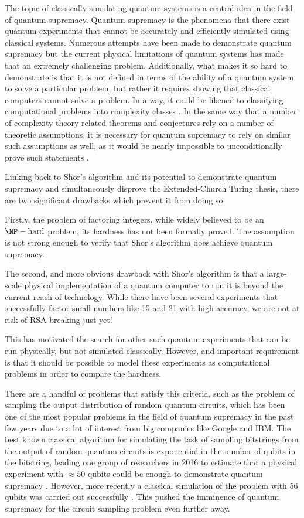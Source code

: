 \documentclass[ %
                    author={Manan Vaswani},
                supervisor={Dr. Raphael Clifford},
                    degree={MEng},
                     title={A multi-core CPU implementation \n of the classical Boson Sampling algorithm},
                  subtitle={},
                      type={},
                      year={2019} ]{dissertation}
\begin{document}
The topic of classically simulating quantum systems is a central idea in the field of quantum supremacy. Quantum supremacy is the phenomena that there exist quantum experiments that cannot be accurately and efficiently simulated using classical systems. Numerous attempts have been made to demonstrate quantum supremacy but the current physical limitations of quantum systems has made that an extremely challenging problem. Additionally, what makes it so hard to demonstrate is that it is not defined in terms of the ability of a quantum system to solve a particular problem, but rather it requires showing that classical computers cannot solve a problem. In a way, it could be likened to classifying computational problems into complexity classes \cite{papadimitriou2003}. In the same way that a number of complexity theory related theorems and conjectures rely on a number of theoretic assumptions, it is necessary for quantum supremacy to rely on similar such assumptions as well, as it would be nearly impossible to unconditionally prove such statements \cite{harrow2017}.

Linking back to Shor's algorithm and its potential to demonstrate quantum supremacy and simultaneously disprove the Extended-Church Turing thesis, there are two significant drawbacks which prevent it from doing so. 

Firstly, the problem of factoring integers, while widely believed to be an $\NP-\text{hard}$ problem, its hardness has not been formally proved. The assumption is not strong enough to verify that Shor's algorithm does achieve quantum supremacy.

The second, and more obvious drawback with Shor's algorithm is that a large-scale physical implementation of a quantum computer to run it is beyond the current reach of technology. While there have been several experiments that successfully factor small numbers like 15 \cite{monz2016} and 21 \cite{vartiainen2004} with high accuracy, we are not at risk of RSA breaking just yet!

This has motivated the search for other such quantum experiments that can be run physically, but not simulated classically. However, and important requirement is that it should be possible to model these experiments as computational problems in order to compare the hardness.

There are a handful of problems that satisfy this criteria, such as the problem of sampling the output distribution of random quantum circuits, which has been one of the most popular problems in the field of quantum supremacy in the past few years due to a lot of interest from big companies like Google and IBM. The best known classical algorithm for simulating the task of sampling bitstrings from the output of random quantum circuits is exponential in the number of qubits in the bitstring, leading one group of researchers in 2016 to estimate that a physical experiment with $\approx 50$ qubits could be enough to demonstrate quantum supremacy \cite{boixo2016}. However, more recently a classical simulation of the problem with 56 qubits was carried out successfully \cite{pednault2017}. This pushed the imminence of quantum supremacy for the circuit sampling problem even further away.
\end{document}
